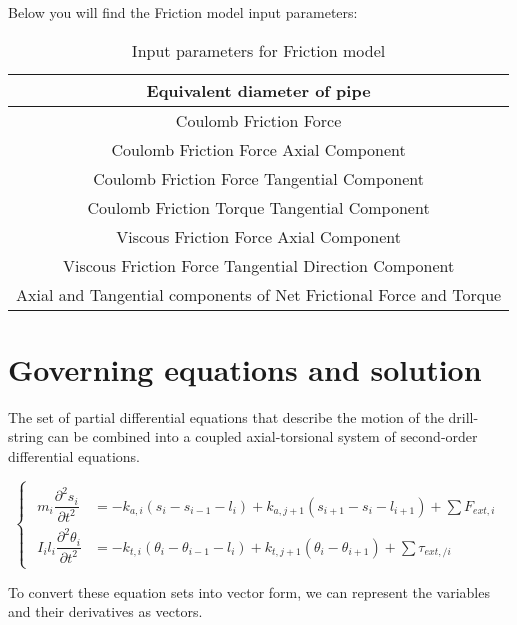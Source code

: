 Below you will find the Friction model input parameters:

\begin{table}
  \centering
  \begin{tabular}{|c|}
    \hline
    Equivalent diameter of pipe\\
    \hline
    Coulomb Friction Force \\
    \hline
    Coulomb Friction Force Axial Component \\
    \hline
    Coulomb Friction Force Tangential Component \\
    \hline
    Coulomb Friction Torque Tangential Component \\
    \hline
    Viscous Friction Force Axial Component \\
    \hline
    Viscous Friction Force Tangential Direction Component \\
    \hline
    Axial and Tangential components of Net Frictional Force and Torque \\
    \hline
  \end{tabular}
  \caption{Input parameters for Friction model}\label{Table_Friction_Input}
\end{table}

\section{Governing equations and solution}

The set of partial differential equations that describe the motion of the drill-string can be combined into a coupled axial-torsional system of second-order differential equations. 

\begin{equation}\label{Governing equations}
  \begin{cases}
   \begin{aligned}
     m_{i}\dfrac{\partial^{2}s_{i}}{\partial t^{2}} & = -k_{a,i}(s_{i}-s_{i-1}-l_{i}) + k_{a,j+1}(s_{i+1}-s_{i}-l_{i+1}) + \sum{F_{ext, i}} \\
     I_{i}l_{i}\dfrac{\partial^{2}\theta_{i}}{\partial t^{2}} & = -k_{t,i}(\theta_{i}-\theta_{i-1}-l_{i}) + k_{t,j+1}(\theta_{i}-\theta_{i+1}) + \sum{\tau_{ext,/ i}}
   \end{aligned}
  \end{cases}
\end{equation}

To convert these equation sets into vector form, we can represent the variables and their derivatives as vectors.

